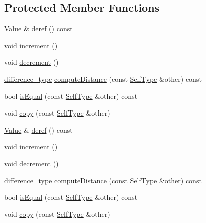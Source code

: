 \subsection*{Protected Member Functions}
\begin{DoxyCompactItemize}
\item 
\hyperlink{classJson_1_1Value}{Value} \& \hyperlink{classJson_1_1ValueIteratorBase_ae675a893b0ad7959e4f5e5aa328b5998}{deref} () const 
\item 
void \hyperlink{classJson_1_1ValueIteratorBase_afe58f9534e1fd2033419fd9fe244551e}{increment} ()
\item 
void \hyperlink{classJson_1_1ValueIteratorBase_affc8cf5ff54a9f432cc693362c153fa6}{decrement} ()
\item 
\hyperlink{classJson_1_1ValueIteratorBase_a4e44bf8cbd17ec8d6e2c185904a15ebd}{difference\-\_\-type} \hyperlink{classJson_1_1ValueIteratorBase_ac52902f3f8369c195a1c2a147dad519a}{compute\-Distance} (const \hyperlink{classJson_1_1ValueIteratorBase_a9d2a940d03ea06d20d972f41a89149ee}{Self\-Type} \&other) const 
\item 
bool \hyperlink{classJson_1_1ValueIteratorBase_a21820d6ee564e541bd118b21e4741962}{is\-Equal} (const \hyperlink{classJson_1_1ValueIteratorBase_a9d2a940d03ea06d20d972f41a89149ee}{Self\-Type} \&other) const 
\item 
void \hyperlink{classJson_1_1ValueIteratorBase_a496e6aba44808433ec5858c178be5719}{copy} (const \hyperlink{classJson_1_1ValueIteratorBase_a9d2a940d03ea06d20d972f41a89149ee}{Self\-Type} \&other)
\item 
\hyperlink{classJson_1_1Value}{Value} \& \hyperlink{classJson_1_1ValueIteratorBase_ae675a893b0ad7959e4f5e5aa328b5998}{deref} () const 
\item 
void \hyperlink{classJson_1_1ValueIteratorBase_afe58f9534e1fd2033419fd9fe244551e}{increment} ()
\item 
void \hyperlink{classJson_1_1ValueIteratorBase_affc8cf5ff54a9f432cc693362c153fa6}{decrement} ()
\item 
\hyperlink{classJson_1_1ValueIteratorBase_a4e44bf8cbd17ec8d6e2c185904a15ebd}{difference\-\_\-type} \hyperlink{classJson_1_1ValueIteratorBase_ac52902f3f8369c195a1c2a147dad519a}{compute\-Distance} (const \hyperlink{classJson_1_1ValueIteratorBase_a9d2a940d03ea06d20d972f41a89149ee}{Self\-Type} \&other) const 
\item 
bool \hyperlink{classJson_1_1ValueIteratorBase_a21820d6ee564e541bd118b21e4741962}{is\-Equal} (const \hyperlink{classJson_1_1ValueIteratorBase_a9d2a940d03ea06d20d972f41a89149ee}{Self\-Type} \&other) const 
\item 
void \hyperlink{classJson_1_1ValueIteratorBase_a496e6aba44808433ec5858c178be5719}{copy} (const \hyperlink{classJson_1_1ValueIteratorBase_a9d2a940d03ea06d20d972f41a89149ee}{Self\-Type} \&other)
\end{DoxyCompactItemize}
